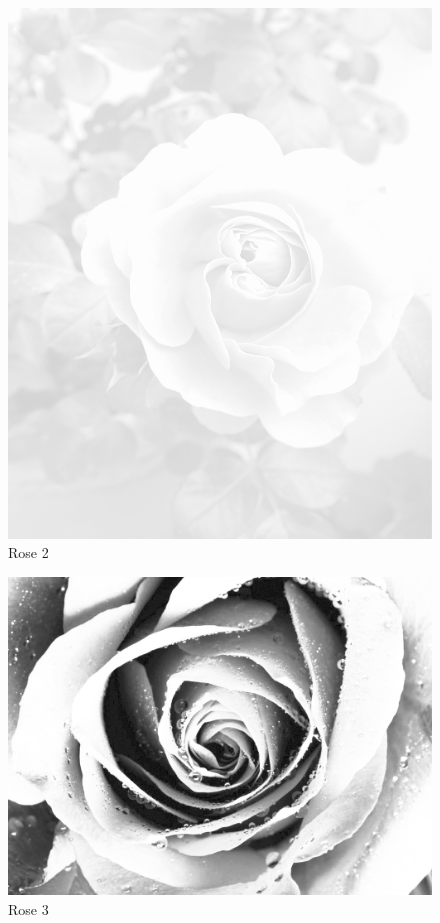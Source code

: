 \documentclass[ngerman,a4paper,11pt]{scrreprt}
\begin{document}
\begin{figure}[H]
\centering
\includegraphics[width=\textwidth,height=.8\textheight]{Bilder/Bilder/750_0010_14361_Hintergrund_Rose_2_Hell.png}
\caption{Rose 2}
\end{figure}

\begin{figure}[H]
\centering
\includegraphics[width=\textwidth,height=.8\textheight]{Bilder/Bilder/750_0010_8140_750_0010_8137_rose_02_SW_hell.png}
\caption{Rose 3}
\end{figure}
\end{document}
